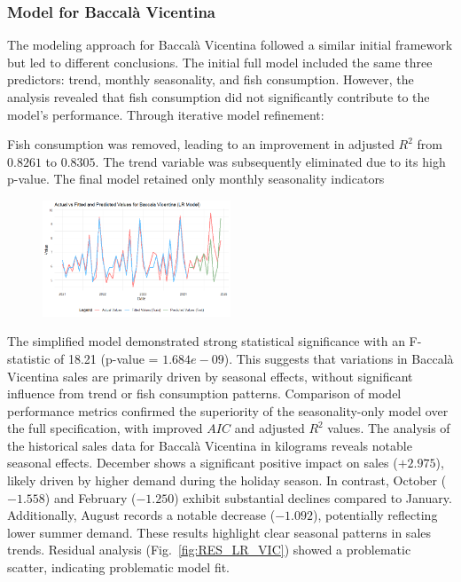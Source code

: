 \documentclass[10pt,twocolumn,letterpaper]{article}
\begin{document}
\subsubsection{Model for Baccalà Vicentina}
The modeling approach for Baccalà Vicentina followed a similar initial framework but led to different conclusions. The initial full model included the same three predictors: trend, monthly seasonality, and fish consumption. However, the analysis revealed that fish consumption did not significantly contribute to the model's performance.
Through iterative model refinement:

Fish consumption was removed, leading to an improvement in adjusted $R^2$ from $0.8261$ to $0.8305$.
The trend variable was subsequently eliminated due to its high p-value.
The final model retained only monthly seasonality indicators
\begin{figure}[H]
    \centering
    \includegraphics[width=0.5\textwidth]{PlotsBEFD/PRED_LR_VIC.png} 
    \caption{}
    \label{fig:PRED_LR_VIC}
\end{figure}
The simplified model demonstrated strong statistical significance with an F-statistic of 18.21 (p-value = $1.684e-09$). This suggests that variations in Baccalà Vicentina sales are primarily driven by seasonal effects, without significant influence from trend or fish consumption patterns.
Comparison of model performance metrics confirmed the superiority of the seasonality-only model over the full specification, with improved $AIC$ and adjusted $R^2$ values. 
\newline
The analysis of the historical sales data for Baccalà Vicentina in kilograms reveals notable seasonal effects. December shows a significant positive impact on sales ($+2.975$), likely driven by higher demand during the holiday season. In contrast, October ($-1.558$) and February ($-1.250$) exhibit substantial declines compared to January. Additionally, August records a notable decrease ($-1.092$), potentially reflecting lower summer demand. These results highlight clear seasonal patterns in sales trends.
\newline
Residual analysis (Fig.~\ref{fig:RES_LR_VIC}) showed a problematic scatter, indicating problematic model fit. 
\end{document}
